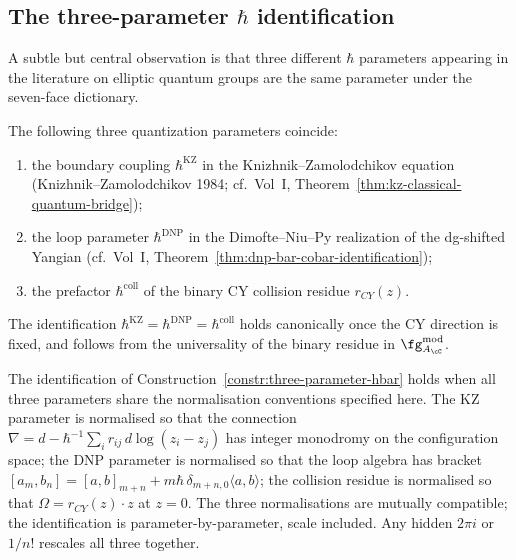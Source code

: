 \subsection{The three-parameter \texorpdfstring{$\hbar$}{hbar} identification}
\label{subsec:three-hbar}

A subtle but central observation is that three different $\hbar$
parameters appearing in the literature on elliptic quantum groups are
the same parameter under the seven-face dictionary.

\begin{construction}
\label{constr:three-parameter-hbar}
The following three quantization parameters coincide:
\begin{enumerate}[label=(\roman*)]
\item the boundary coupling $\hbar^{\mathrm{KZ}}$ in the Knizhnik--Zamolodchikov
equation (Knizhnik--Zamolodchikov 1984; cf.\ Vol~I,
Theorem~\ref{thm:kz-classical-quantum-bridge});
\item the loop parameter $\hbar^{\mathrm{DNP}}$ in the Dimofte--Niu--Py
realization of the dg-shifted Yangian (cf.\ Vol~I,
Theorem~\ref{thm:dnp-bar-cobar-identification});
\item the prefactor $\hbar^{\mathrm{coll}}$ of the binary CY collision
residue $r_{CY}(z)$.
\end{enumerate}
The identification $\hbar^{\mathrm{KZ}} = \hbar^{\mathrm{DNP}} =
\hbar^{\mathrm{coll}}$ holds canonically once the CY direction is fixed,
and follows from the universality of the binary residue in
$\fg^{\mathrm{mod}}_{A_\cC}$.
\end{construction}

\begin{remark}
\label{rem:three-hbar-sanity}
The identification of
Construction~\ref{constr:three-parameter-hbar} holds when all three
parameters share the normalisation conventions specified here.
The KZ parameter is normalised so that the connection
$\nabla = d - \hbar^{-1} \sum_i r_{ij}\, d\log(z_i - z_j)$
has integer monodromy on the configuration space; the DNP parameter
is normalised so that the loop algebra has bracket
$[a_m, b_n] = [a, b]_{m + n} + m \hbar\, \delta_{m + n, 0} \langle a, b \rangle$;
the collision residue is normalised so that
$\Omega = r_{CY}(z) \cdot z$ at $z = 0$. The three normalisations are
mutually compatible; the identification is parameter-by-parameter,
scale included. Any hidden $2\pi i$ or $1/n!$ rescales all three
together.
\end{remark}


